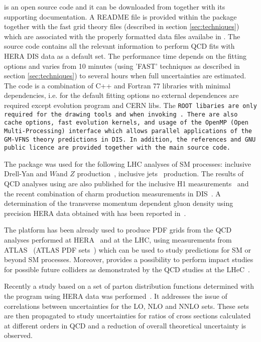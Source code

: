 
\fitter is an open source code and it can be downloaded from \cite{herafitter:page}
together with its supporting documentation. A README file is provided within the package together with the fast grid theory files (described in section \ref{sec:techniques}) which are associated with the properly formatted data files availabe in \fitter.
The source code contains all the relevant information to perform QCD fits with HERA DIS data as a default set. The performance time depends on the fitting options and varies from 10 minutes 
(using 'FAST' techniques as described in section \ref{sec:techniques}) to several hours when full uncertainties are estimated. The \fitter code is a combination of C++ and Fortran 77 libraries with minimal 
dependencies, i.e. for the default fitting options no external dependences are required  except \qcdnum evolution program \cite{qcdnum} and CERN libs. The \tt ROOT \rm  libaries are only required for the drawing tools and when invoking \applgrid\rm.  
There are also cache options, fast evolution kernels, and usage of the OpenMP (Open Multi-Processing)  interface which allows parallel applications of the GM-VFNS theory predictions in DIS. 
In addition, the \fitter references and GNU public licence are provided 
together with the main source code. 


The \fitter package was used for the following LHC analyses of SM processes:
inclusive Drell-Yan and $W$and $Z$ 
production~\cite{atlas:strange,atlas:hm,cms:strange},
inclusive jets~\cite{atlas:jets} production.
The results of QCD analyses using \fitter are also
published for the inclusive H1 measurements~\cite{h1:2012kk}
and the recent combination of charm production measurements 
in DIS~\cite{h1zeus:charm}.
A determination of the transverse momentum dependent gluon density using precision HERA data obtained with \fitter has been reported in~\cite{Jung2014}. 


The \fitter platform has been already used to produce PDF grids 
from the QCD analyses performed at 
HERA~\cite{h1zeus:2009wt,hera:grids} and at the LHC, using 
measurements from ATLAS~\cite{atlas:strange,atlas:jets} (ATLAS PDF sets~\cite{atlas:grids}) which can be used to study predictions for SM or beyond SM processes.  Moreover, \fitter provides a possibility to 
perform impact studies for possible future colliders
as demonstrated by the QCD studies at the LHeC~\cite{lhec:studies}.

Recently a study based on a set of parton distribution functions 
determined with the \fitter program using HERA data was performed~\cite{hfcorrpaper}. It addresses the issue of correlations between uncertainties for the LO,
NLO and NNLO sets. These sets are then propagated to study uncertainties 
for ratios of cross sections calculated at different orders in QCD and  
a reduction of overall theoretical uncertainty is observed.







